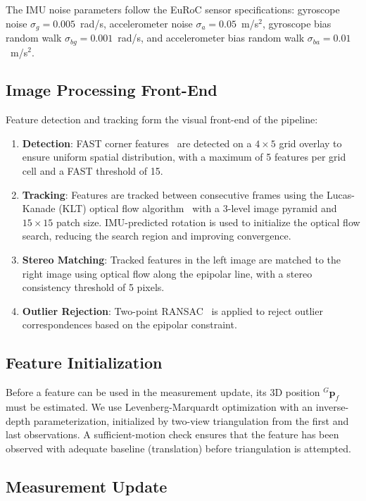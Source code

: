 \documentclass[conference]{IEEEtran}
\begin{document}
The IMU noise parameters follow the EuRoC sensor specifications: gyroscope noise $\sigma_g = 0.005$~rad/s, accelerometer noise $\sigma_a = 0.05$~m/s$^2$, gyroscope bias random walk $\sigma_{bg} = 0.001$~rad/s, and accelerometer bias random walk $\sigma_{ba} = 0.01$~m/s$^2$.

\subsection{Image Processing Front-End}

Feature detection and tracking form the visual front-end of the pipeline:

\begin{enumerate}
\item \textbf{Detection}: FAST corner features~\cite{rosten2006} are detected on a $4 \times 5$ grid overlay to ensure uniform spatial distribution, with a maximum of 5 features per grid cell and a FAST threshold of 15.
\item \textbf{Tracking}: Features are tracked between consecutive frames using the Lucas-Kanade (KLT) optical flow algorithm~\cite{lucas1981} with a 3-level image pyramid and $15 \times 15$ patch size. IMU-predicted rotation is used to initialize the optical flow search, reducing the search region and improving convergence.
\item \textbf{Stereo Matching}: Tracked features in the left image are matched to the right image using optical flow along the epipolar line, with a stereo consistency threshold of 5 pixels.
\item \textbf{Outlier Rejection}: Two-point RANSAC~\cite{fischler1981} is applied to reject outlier correspondences based on the epipolar constraint.
\end{enumerate}

\subsection{Feature Initialization}

Before a feature can be used in the measurement update, its 3D position ${}^G\mathbf{p}_f$ must be estimated. We use Levenberg-Marquardt optimization with an inverse-depth parameterization, initialized by two-view triangulation from the first and last observations. A sufficient-motion check ensures that the feature has been observed with adequate baseline (translation) before triangulation is attempted.

\subsection{Measurement Update}
\end{document}
